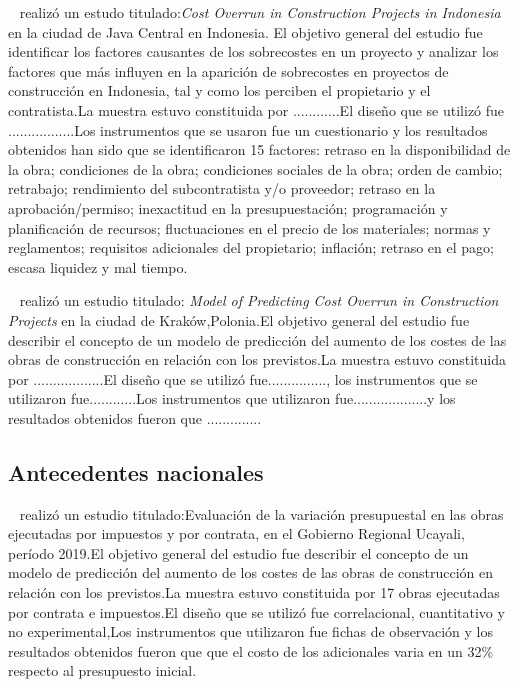 ~\cite{Susanti2020} realizó un estudo titulado:\textit{Cost Overrun in Construction Projects in Indonesia} en la ciudad de Java Central en Indonesia.
El objetivo general del estudio fue identificar los factores causantes de los sobrecostes en un proyecto y analizar los factores que más influyen en la aparición de sobrecostes en proyectos de construcción en Indonesia, tal y como los perciben el propietario y el contratista.La muestra estuvo constituida por ............El diseño que se utilizó fue .................Los instrumentos que se usaron fue un cuestionario y los resultados obtenidos han sido que se identificaron 15 factores: retraso en la disponibilidad de la obra; condiciones de la obra; condiciones sociales de la obra; orden de cambio; retrabajo; rendimiento del subcontratista y/o proveedor; retraso en la aprobación/permiso; inexactitud en la presupuestación; programación y planificación de recursos; fluctuaciones en el precio de los materiales; normas y reglamentos; requisitos adicionales del propietario; inflación; retraso en el pago; escasa liquidez y mal tiempo. 

~\cite{Plebankiewicz2018} realizó un estudio titulado: \textit{Model of Predicting Cost Overrun in Construction Projects} en la ciudad de Kraków,Polonia.El objetivo general del estudio fue describir el concepto de un modelo de predicción del aumento de los costes de las obras de construcción en relación con los previstos.La muestra estuvo constituida por ..................El diseño que se utilizó fue..............., los instrumentos que se utilizaron fue............Los instrumentos que utilizaron fue...................y los resultados obtenidos fueron que ..............

\subsection{Antecedentes nacionales}

~\cite{FloresBedon2022} realizó un estudio titulado:Evaluación de la variación presupuestal en las obras ejecutadas por impuestos y por contrata, en el Gobierno Regional Ucayali, período 2019.El objetivo general del estudio fue describir el concepto de un modelo de predicción del aumento de los costes de las obras de construcción en relación con los previstos.La muestra estuvo constituida por 17 obras ejecutadas por contrata e impuestos.El diseño que se utilizó fue correlacional, cuantitativo y no experimental,Los instrumentos que utilizaron fue fichas de observación y los resultados obtenidos fueron que que el costo de los adicionales varia en un 32\% respecto al presupuesto inicial.


